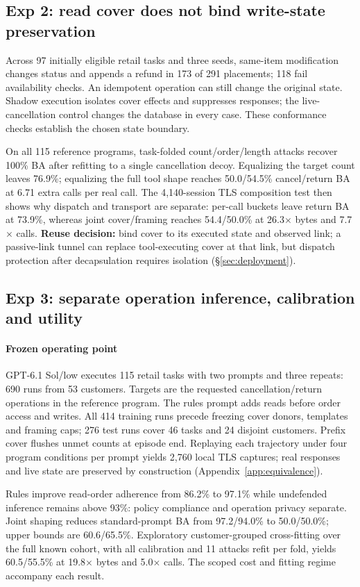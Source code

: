 \subsection{Exp 2: read cover does not bind write-state preservation}\label{sec:exp-state}
Across 97 initially eligible retail tasks and three seeds, same-item modification changes status and appends a refund in 173 of 291 placements; 118 fail availability checks. An idempotent operation can still change the original state. Shadow execution isolates cover effects and suppresses responses; the live-cancellation control changes the database in every case. These conformance checks establish the chosen state boundary.

On all 115 reference programs, task-folded count/order/length attacks recover 100\% BA after refitting to a single cancellation decoy. Equalizing the target count leaves 76.9\%; equalizing the full tool shape reaches 50.0/54.5\% cancel/return BA at 6.71 extra calls per real call. The 4,140-session TLS composition test then shows why dispatch and transport are separate: per-call buckets leave return BA at 73.9\%, whereas joint cover/framing reaches 54.4/50.0\% at 26.3$\times$ bytes and 7.7$\times$ calls. \textbf{Reuse decision:} bind cover to its executed state and observed link; a passive-link tunnel can replace tool-executing cover at that link, but dispatch protection after decapsulation requires isolation (\S\ref{sec:deployment}).

\subsection{Exp 3: separate operation inference, calibration and utility}\label{sec:real-agent}\label{sec:r5}
\paragraph{Frozen operating point}
GPT-6.1 Sol/low executes 115 retail tasks with two prompts and three repeats: 690 runs from 53 customers. Targets are the requested cancellation/return operations in the reference program. The rules prompt adds reads before order access and writes. All 414 training runs precede freezing cover donors, templates and framing caps; 276 test runs cover 46 tasks and 24 disjoint customers. Prefix cover flushes unmet counts at episode end. Replaying each trajectory under four program conditions per prompt yields 2,760 local TLS captures; real responses and live state are preserved by construction (Appendix~\ref{app:equivalence}).

Rules improve read-order adherence from 86.2\% to 97.1\% while undefended inference remains above 93\%: policy compliance and operation privacy separate. Joint shaping reduces standard-prompt BA from 97.2/94.0\% to 50.0/50.0\%; upper bounds are 60.6/65.5\%. Exploratory customer-grouped cross-fitting over the full known cohort, with all calibration and 11 attacks refit per fold, yields 60.5/55.5\% at 19.8$\times$ bytes and 5.0$\times$ calls. The scoped cost and fitting regime accompany each result.

